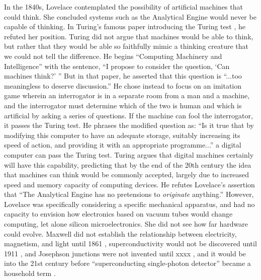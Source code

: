\newpage
\appendix

\vspace{3em}
In the 1840s, Lovelace contemplated the possibility of artificial machines that could think. She concluded systems such as the Analytical Engine would never be capable of thinking. In Turing's famous paper introducing the Turing test \cite{tu1950}, he refuted her position. Turing did not argue that machines would be able to think, but rather that they would be able so faithfully mimic a thinking creature that we could not tell the difference. He begins ``Computing Machinery and Intelligence'' with the sentence, ``I propose to consider the question, `Can machines think?' '' But in that paper, he asserted that this question is ``...too meaningless to deserve discussion.'' He chose instead to focus on an imitation game wherein an interrogator is in a separate room from a man and a machine, and the interrogator must determine which of the two is human and which is artificial by asking a series of questions. If the machine can fool the interrogator, it passes the Turing test. He phrases the modified question as: ``Is it true that by modifying this computer to have an adequate storage, suitably increasing its speed of action, and providing it with an appropriate programme...'' a digital computer can pass the Turing test. Turing argues that digital machines certainly will have this capability, predicting that by the end of the 20th century the idea that machines can think would be commonly accepted, largely due to increased speed and memory capacity of computing devices. He refutes Lovelace's assertion that ``The Analytical Engine has no pretensions to \textit{originate} anything.'' However, Lovelace was specifically considering a specific mechanical apparatus, and had no capacity to envision how electronics based on vacuum tubes would change computing, let alone silicon microelectronics. She did not see how far hardware could evolve. Maxwell did not establish the relationship between electricity, magnetism, and light until 1861 \cite{}, superconductivity would not be discovered until 1911 \cite{on1911}, and Josephson junctions were not invented until xxxx \cite{}, and it would be into the 21st century before ``superconducting single-photon detector'' became a household term \cite{}. 


